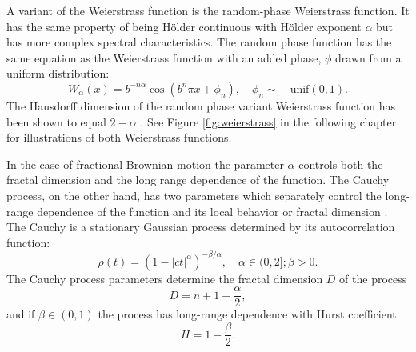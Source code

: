 
A variant of the Weierstrass function is the random-phase 
Weierstrass function. It has the same property of being 
 H\"older continuous with H\"older exponent 
 $\alpha$ but has more complex 
spectral characteristics\cite{hunt1998}.  
The random phase function has the same equation as the 
Weierstrass function with an added phase, $\phi$ drawn from 
a uniform distribution:
\[
  W_{\alpha}(x) 
   = b^{-n \alpha} \cos(b^n \pi x  + \phi_n), \hspace{1em} 
   \phi_n \sim \hspace{1em} \text{unif}(0,1).
\] 
The Hausdorff dimension of the random phase variant Weierstrass function has been shown to equal $2- \alpha$ \cite{hunt1998}. 
See Figure \ref{fig:weierstrass} in the following chapter 
for illustrations of both Weierstrass functions.

In the case of fractional Brownian motion the parameter 
$\alpha$ controls both the fractal dimension and the
long range dependence of the function. The Cauchy process, 
on the other hand, has two parameters which separately control 
the long-range dependence of the function 
and its local behavior or fractal dimension \cite{gneiting2004}.
The Cauchy is a stationary Gaussian process determined by
 its autocorrelation function:
\[
   \rho(t) =  (1 - |ct|^{\alpha})^{-\beta/\alpha}, 
   \hspace{1em} \alpha \in (0,2]; \beta > 0.
\]
The Cauchy process parameters determine the fractal 
dimension $D$ of the  process 
  \[
    D = n + 1  - \frac{\alpha}{2},
  \]
  and if $\beta \in (0,1)$ the process has long-range 
  dependence with Hurst coefficient 
  \[
    H  =   1 - \frac{\beta}{2}.
  \]








